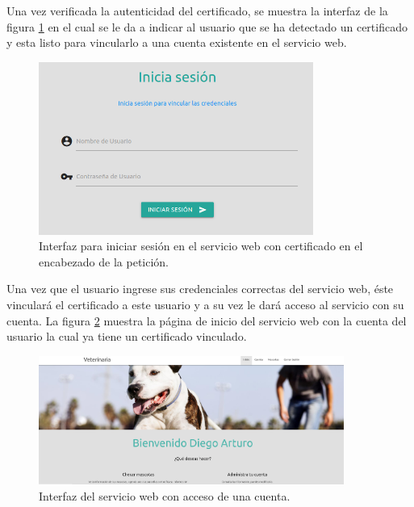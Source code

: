 \documentclass[12pt, a4paper, titlepage]{report}
\begin{document}
    	        Una vez verificada la autenticidad del certificado, se muestra la interfaz de la figura \ref{fig:UI_iniciarSesionChaffing} en el cual se le da a indicar al usuario que se ha detectado un certificado y esta listo para vincularlo a una cuenta existente en el servicio web.
	        
    	        \begin{figure}[H]
    				\begin{center}	\includegraphics[width=9cm]{./imagenes/Disenio/Componente_1/UI_iniciarSesionChaffing.PNG}
    					\caption[Interfaz]{Interfaz para iniciar sesión en el servicio web con certificado en el encabezado de la petición.}
    				\label{fig:UI_iniciarSesionChaffing}
    				\end{center}
    			\end{figure}
	        
    	        Una vez que el usuario ingrese sus credenciales correctas del servicio web, éste vinculará el certificado a este usuario y a su vez le dará acceso al servicio con su cuenta.
    	        La figura \ref{fig:UI_homeUsuario} muestra la página de inicio del servicio web con la cuenta del usuario la cual ya tiene un certificado vinculado.
	        
    	        \begin{figure}[H]
    				\begin{center}	\includegraphics[width=10cm]{./imagenes/Disenio/Componente_1/UI_homeUsuario.PNG}
    					\caption[Interfaz]{Interfaz del servicio web con acceso de una cuenta.}
    				\label{fig:UI_homeUsuario}
    				\end{center}
    			\end{figure}
    	        
\end{document}
